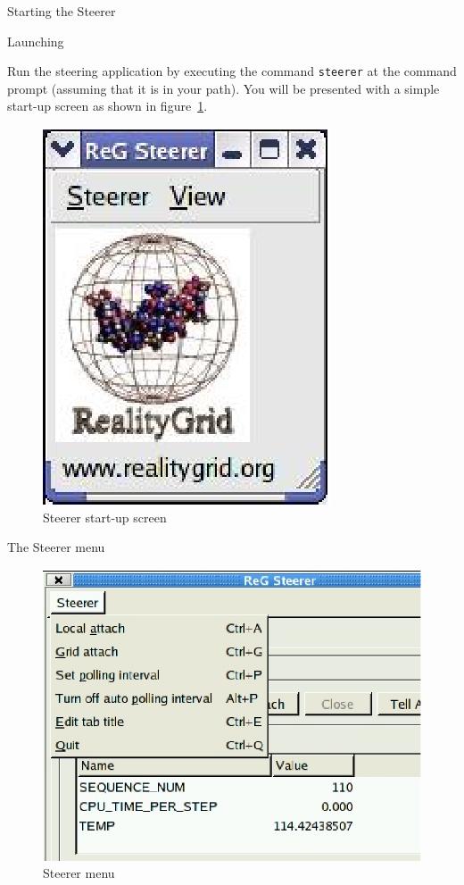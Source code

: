 \documentclass[a4paper,twoside]{article}
\begin{document}
\begin{section}{Starting the Steerer}

\begin{subsection}{Launching}

Run the steering application by executing the command \texttt{steerer}
at the command prompt (assuming that it is in your path). You will be
presented with a simple start-up screen as shown in
figure~\ref{fig:startup_screen}.


\begin{figure}
\centerline{\includegraphics{startup_screen.eps}}
\caption{Steerer start-up screen}
\label{fig:startup_screen}
\end{figure}

\end{subsection}


\begin{subsection}{The Steerer menu}


\begin{figure}
\centerline{\includegraphics{Steerer_menu.eps}}
\caption{Steerer menu}
\label{fig:steerer_menu}
\end{figure}


\end{subsection}
\end{section}
\end{document}
